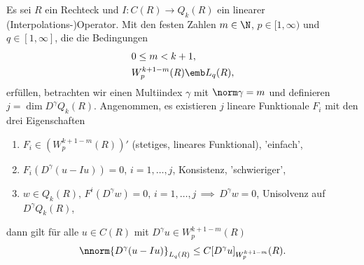 \begin{lemma}\label{lem:7-6}
  Es sei $R$ ein Rechteck und $I:C(R) \to Q_{k}(R)$ ein linearer (Interpolations-)Operator. Mit den festen Zahlen $m \in \N$, $p\in [1, \infty)$ und $q \in [1, \infty]$, die die Bedingungen 
  \begin{align*}
    &0 \leq m < k+1, \\
    &W_{p}^{k+1-m}(R) \emb L_{q}(R), 
  \end{align*}
erfüllen, betrachten wir einen Multiindex $\gamma$ mit $\norm\gamma = m$ und definieren $j = \dim D^{\gamma} Q_{k}(R)$. Angenommen, es existieren $j$ lineare Funktionale $F_{i}$ mit den drei Eigenschaften
\begin{enumerate}
\item $F_{i} \in (W_{p}^{k+1-m} (R))'$ (stetiges, lineares Funktional), 'einfach', 
\item $F_{i}(D^{\gamma}(u- Iu)) = 0$, $i = 1, \dots, j$, Konsistenz, 'schwieriger', 
\item $w \in Q_{k}(R), \, F^{i}(D^{\gamma}w) = 0, \, i = 1, \dots, j \, \implies\, D^{\gamma}w = 0$, Unisolvenz auf $D^{\gamma}Q_{k}(R)$, 
\end{enumerate}
dann gilt für alle $u \in C(R)$ mit $D^{\gamma}u \in W_{p}^{k+1-m}(R)$
\begin{align*}
  \nnorm{D^{\gamma}(u-Iu)}_{ L_{q}(R)}\leq C [D^{\gamma}u]_{W_{p}^{k+1-m}}(R). 
\end{align*}
\end{lemma}

